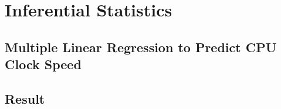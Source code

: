 \section{Inferential Statistics}

\subsection{ Multiple Linear Regression to Predict CPU Clock Speed}

\subsection{Result}

\newpage